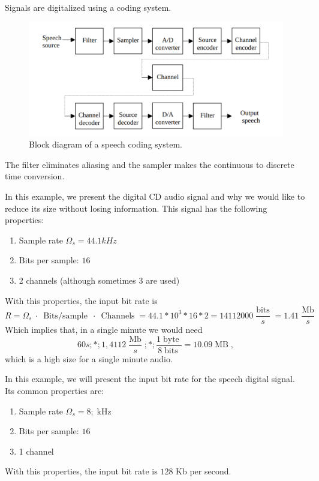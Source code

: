 Signals are digitalized using a coding system.

\begin{figure}[!h]
  \centering
  \includegraphics[scale=0.5]{Figures/SpeechCodingSystem}
  \caption{Block diagram of a speech coding system.}
\end{figure}

The filter eliminates aliasing and the sampler makes the continuous to discrete time conversion.

\begin{example}
  In this example, we present the digital CD audio signal and why we would like to reduce its size without losing information. This signal has the following properties:

  \begin{enumerate}
    \item Sample rate \(\Omega_{s} = 44.1 kHz\)
    \item Bits per sample: \(16\)
          \item 2 channels (although sometimes 3 are used)
  \end{enumerate}

  With this properties, the input bit rate is
  \[
    R = \Omega_{s} \ \cdot \ \operatorname{Bits/sample} \ \cdot \ \operatorname{Channels} = 44.1*10^{3} * 16 * 2 = 14112000 \frac{\operatorname{bits}}{s} = 1.41 \frac{\operatorname{Mb}}{s}
  \]
  Which implies that, in a single minute we would need
  \[
    60s ; * ; 1,4112 \frac{\operatorname{Mb}}{s} ; * ; \frac{1 \operatorname{byte}}{8 \operatorname{bits}} = 10.09 \operatorname{MB},
  \]
  which is a high size for a single minute audio.
\end{example}

\begin{example}
  In this example, we will present the input bit rate for the speech digital signal. Its common properties are:
    \begin{enumerate}
    \item Sample rate \(\Omega_{s} = 8 ; \operatorname{kHz}\)
    \item Bits per sample: \(16\)
          \item 1 channel
    \end{enumerate}

  With this properties, the input bit rate is \(128\) Kb per second.

\end{example}
